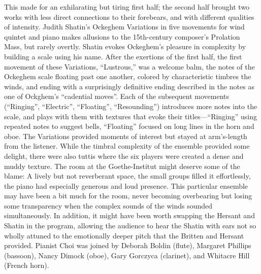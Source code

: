 This made for an exhilarating but tiring first half; the second half brought two works with less direct connections to their forebears, and with different qualities of intensity. Judith Shatin’s Ockeghem Variations in five movements for wind quintet and piano makes allusions to the 15th-century composer’s Prolation Mass, but rarely overtly. Shatin evokes Ockeghem’s pleasure in complexity by building a scale using his name. After the exertions of the first half, the first movement of these Variations, “Lustrous,” was a welcome balm, the notes of the Ockeghem scale floating past one another, colored by characteristic timbres the winds, and ending with a surprisingly definitive ending described in the notes as one of Ockghem’s “cadential moves”. Each of the subsequent movements (“Ringing”, “Electric”, “Floating”, “Resounding”) introduces more notes into the scale, and plays with them with textures that evoke their titles—“Ringing” using repeated notes to suggest bells, “Floating” focused on long lines in the horn and oboe. The Variations provided moments of interest but stayed at arm’s-length from the listener. While the timbral complexity of the ensemble provided some delight, there were also tuttis where the six players were created a dense and muddy texture. The room at the Goethe-Institut might deserve some of the blame: A lively but not reverberant space, the small groups filled it effortlessly, the piano had especially generous and loud presence. This particular ensemble may have been a bit much for the room, never becoming overbearing but losing some transparency when the complex sounds of the winds sounded simultaneously. In addition, it might have been worth swapping the Hersant and Shatin in the program, allowing the audience to hear the Shatin with ears not so wholly attuned to the emotionally deeper pitch that the Britten and Hersant provided. Pianist Choi was joined by Deborah Boldin (flute), Margaret Phillips (bassoon), Nancy Dimock (oboe), Gary Gorczyca (clarinet), and Whitacre Hill (French horn).

